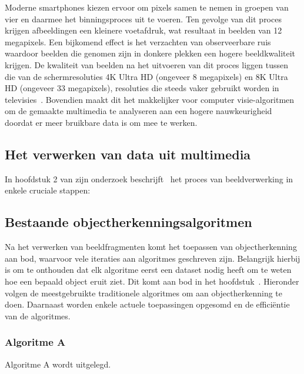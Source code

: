 Moderne smartphones kiezen ervoor om pixels samen te nemen in groepen van vier en daarmee het binningsproces uit te voeren.
Ten gevolge van dit proces krijgen afbeeldingen een kleinere voetafdruk, wat resultaat in beelden van 12 megapixels.
Een bijkomend effect is het verzachten van observeerbare ruis waardoor beelden die genomen zijn in donkere plekken een hogere beeldkwaliteit krijgen.
De kwaliteit van beelden na het uitvoeren van dit proces liggen tussen die van de schermresoluties 4K Ultra HD (ongeveer 8 megapixels) en 8K Ultra HD (ongeveer 33 megapixels), resoluties die steeds vaker gebruikt worden in televisies~\autocite{Statista2024}.
Bovendien maakt dit het makkelijker voor computer visie-algoritmen om de gemaakte multimedia te analyseren aan een hogere nauwkeurigheid doordat er meer bruikbare data is om mee te werken.

\subsection{Het verwerken van data uit multimedia}\label{subsec:het-verwerken-van-data}
In hoofdstuk 2 van zijn onderzoek beschrijft~\textcite{Olaoye2024} het proces van beeldverwerking in enkele cruciale stappen:

\subsection{Bestaande objectherkenningsalgoritmen}\label{subsec:bestaande-algoritmen}
Na het verwerken van beeldfragmenten komt het toepassen van objectherkenning aan bod, waarvoor vele iteraties aan algoritmes geschreven zijn.
Belangrijk hierbij is om te onthouden dat elk algoritme eerst een dataset nodig heeft om te weten hoe een bepaald object eruit ziet.
Dit komt aan bod in het hoofdstuk~.
Hieronder volgen de meestgebruikte traditionele algoritmes om aan objectherkenning te doen.
Daarnaast worden enkele actuele toepassingen opgesomd en de effici\"entie van de algoritmes.

\subsubsection{Algoritme A}
Algoritme A wordt uitgelegd.



